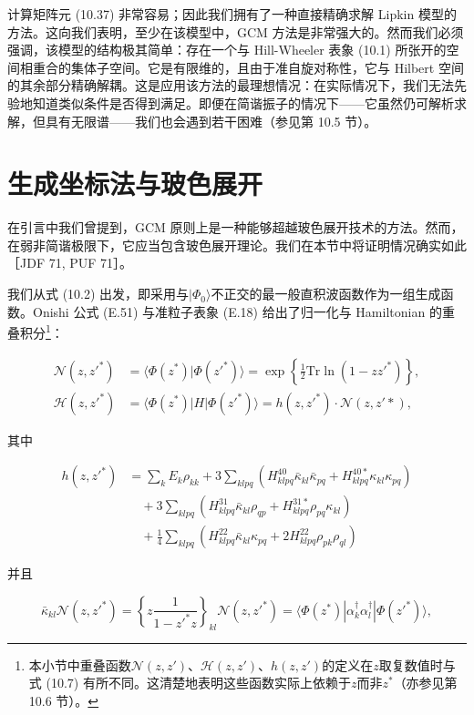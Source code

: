 计算矩阵元 (10.37) 非常容易；因此我们拥有了一种直接精确求解 Lipkin 模型的方法。这向我们表明，至少在该模型中，GCM
方法是非常强大的。然而我们必须强调，该模型的结构极其简单：存在一个与 Hill-Wheeler 表象 (10.1) 所张开的空间相重合的集体子空间。它是有限维的，且由于准自旋对称性，它与
Hilbert 空间的其余部分精确解耦。这是应用该方法的最理想情况：在实际情况下，我们无法先验地知道类似条件是否得到满足。即便在简谐振子的情况下——它虽然仍可解析求解，但具有无限谱——我们也会遇到若干困难（参见第
10.5 节）。

\section{生成坐标法与玻色展开}

在引言中我们曾提到，GCM 原则上是一种能够超越玻色展开技术的方法。然而，在弱非简谐极限下，它应当包含玻色展开理论。我们在本节中将证明情况确实如此［JDF
71, PUF 71］。

我们从式 (10.2) 出发，即采用与$|\Phi_{0}\rangle$不正交的最一般直积波函数作为一组生成函数。Onishi
公式 (E.51) 与准粒子表象 (E.18) 给出了归一化与 Hamiltonian 的重叠积分\footnote{本小节中重叠函数$\mathscr{N}(z,z')$、$\mathscr{H}(z,z')$、$h(z,z')$的定义在$z$取复数值时与式
(10.7) 有所不同。这清楚地表明这些函数实际上依赖于$z$而非$z^{*}$（亦参见第 10.6 节）。}：

\begin{align}
\mathscr{N}(z,z'^{*}) & =\langle\Phi(z^{*})|\Phi(z'^{*})\rangle=\exp\left\{ \frac{1}{2}\mathrm{Tr}\ln(1-zz'^{*})\right\} ,\label{eq:gcm_norm_onishi}\\
\mathscr{H}(z,z'^{*}) & =\langle\Phi(z^{*})|H|\Phi(z'^{*})\rangle=h(z,z'^{*})\cdot\mathscr{N}(z,z'*),\nonumber 
\end{align}

其中

\begin{align}
h(z,z'^{*}) & =\sum_{k}E_{k}\rho_{kk}+3\sum_{klpq}(H^{40}_{klpq}\bar{\kappa}_{kl}\bar{\kappa}_{pq}+H^{40*}_{klpq}\kappa_{kl}\kappa_{pq})\nonumber \\
 & \quad+3\sum_{klpq}(H^{31}_{klpq}\bar{\kappa}_{kl}\rho_{qp}+H^{31*}_{klpq}\rho_{pq}\kappa_{kl})\nonumber \\
 & \quad+\frac{1}{4}\sum_{klpq}(H^{22}_{klpq}\bar{\kappa}_{kl}\kappa_{pq}+2H^{22}_{klpq}\rho_{pk}\rho_{ql})\label{eq:gcm_reduced_hamiltonian}
\end{align}

并且

\begin{equation}
\bar{\kappa}_{kl}\mathscr{N}(z,z'^{*})=\left\{ z\frac{1}{1-z'^{*}z}\right\} _{kl}\mathscr{N}(z,z'^{*})=\langle\Phi(z^{*})|\alpha^{\dagger}_{k}\alpha^{\dagger}_{l}|\Phi(z'^{*})\rangle,\label{eq:gcm_bar_kappa_def}
\end{equation}

